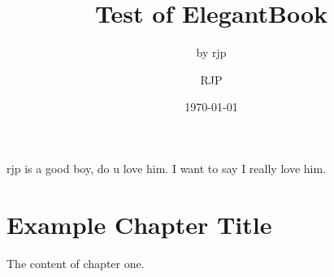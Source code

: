 \documentclass{elegantbook}
\title{Test of ElegantBook}
\subtitle{by rjp}
\author{RJP}
\institute{TJU}
\date{\today}
\begin{document}
\maketitle
rjp is a good boy, do u love him. I want to say I really love him.
\tableofcontents
\mainmatter
\hypersetup{pageanchor=true} 
\chapter{Example Chapter Title} 
The content of chapter one.
\end{document}
